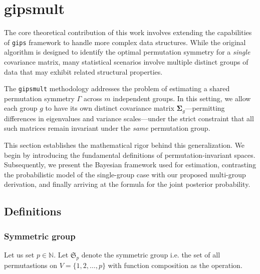 \documentclass[a4paper,11pt,twoside]{report}
\theoremstyle{definition}
\begin{document}
\section{gipsmult}
\label{sec:gipsmult_theory}

The core theoretical contribution of this work involves extending the capabilities of \texttt{gips} framework to handle more complex data structures. While the original algorithm is designed to identify the optimal permutation symmetry for a \textit{single} covariance matrix, many statistical scenarios involve multiple distinct groups of data that may exhibit related structural properties.

The \texttt{gipsmult} methodology addresses the problem of estimating a shared permutation symmetry $\Gamma$ across $m$ independent groups. In this setting, we allow each group $g$ to have its own distinct covariance matrix $\boldsymbol{\Sigma}_g$—permitting differences in eigenvalues and variance scales—under the strict constraint that all such matrices remain invariant under the \textit{same} permutation group.

This section establishes the mathematical rigor behind this generalization. We begin by introducing the fundamental definitions of permutation-invariant spaces. Subsequently, we present the Bayesian framework used for estimation, contrasting the probabilistic model of the single-group case with our proposed multi-group derivation, and finally arriving at the formula for the joint posterior probability.

\subsection{Definitions}
\subsubsection{Symmetric group}
Let us set $p \in \mathbb{N}$. Let $\mathfrak{S}_p$ denote the symmetric group i.e. the set of all permutastions on $V = \{1,2, \dots, p\}$
with function composition as the operation.
\end{document}

